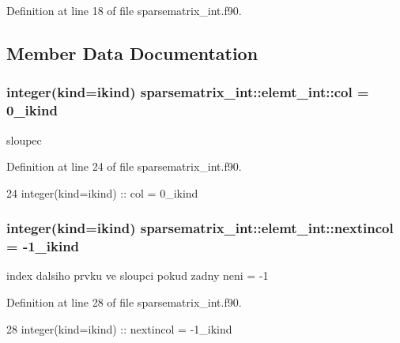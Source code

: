 Definition at line 18 of file sparsematrix\+\_\+int.\+f90.



\subsection{Member Data Documentation}
\subsubsection[{col}]{\setlength{\rightskip}{0pt plus 5cm}integer(kind=ikind) sparsematrix\+\_\+int\+::elemt\+\_\+int\+::col = 0\+\_\+ikind}\label{structsparsematrix__int_1_1elemt__int_a779004fc8122f44bf0fe3fb88fc76c4e}


sloupec 



Definition at line 24 of file sparsematrix\+\_\+int.\+f90.


\begin{DoxyCode}
24         \textcolor{keywordtype}{integer(kind=ikind)} :: col = 0\_ikind
\end{DoxyCode}
\subsubsection[{nextincol}]{\setlength{\rightskip}{0pt plus 5cm}integer(kind=ikind) sparsematrix\+\_\+int\+::elemt\+\_\+int\+::nextincol = -\/1\+\_\+ikind}\label{structsparsematrix__int_1_1elemt__int_ae082dffb4293ed57847a51375f28f1bb}


index dalsiho prvku ve sloupci pokud zadny neni = -\/1 



Definition at line 28 of file sparsematrix\+\_\+int.\+f90.


\begin{DoxyCode}
28         \textcolor{keywordtype}{integer(kind=ikind)} :: nextincol = -1\_ikind
\end{DoxyCode}
